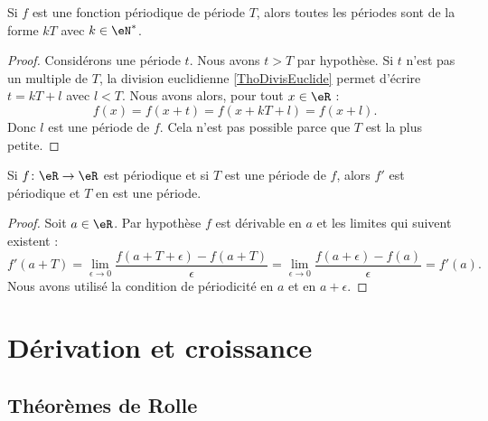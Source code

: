 \begin{lemma}        \label{LEMooOGFGooCnTDjO}
	Si \( f\) est une fonction périodique de période \( T\), alors toutes les périodes sont de la forme \( kT\) avec \( k\in \eN^*\).
\end{lemma}

\begin{proof}
	Considérons une période \( t\). Nous avons \( t>T\) par hypothèse. Si \( t\) n'est pas un multiple de \( T\), la division euclidienne \ref{ThoDivisEuclide} permet d'écrire \( t=kT+l\) avec \( l<T\). Nous avons alors, pour tout \( x\in \eR\) :
	\begin{equation}
		f(x)=f(x+t)=f(x+kT+l)=f(x+l).
	\end{equation}
	Donc \( l\) est une période de \( f\). Cela n'est pas possible parce que \( T\) est la plus petite.
\end{proof}

\begin{lemma}       \label{LEMooHWQYooXcNLts}
	Si \( f\colon \eR\to \eR\) est périodique et si \( T\) est une période de \( f\), alors \( f'\) est périodique et \( T\) en est une période.
\end{lemma}

\begin{proof}
	Soit \( a\in \eR\). Par hypothèse \( f\) est dérivable en \( a\) et les limites qui suivent existent :
	\begin{equation}
		f'(a+T)=\lim_{\epsilon\to 0}\frac{ f(a+T+\epsilon)-f(a+T) }{ \epsilon }=\lim_{\epsilon\to 0}\frac{ f(a+\epsilon)-f(a) }{ \epsilon }=f'(a).
	\end{equation}
	Nous avons utilisé la condition de périodicité en \( a\) et en \( a+\epsilon\).
\end{proof}

\section{Dérivation et croissance}

\subsection{Théorèmes de Rolle}

